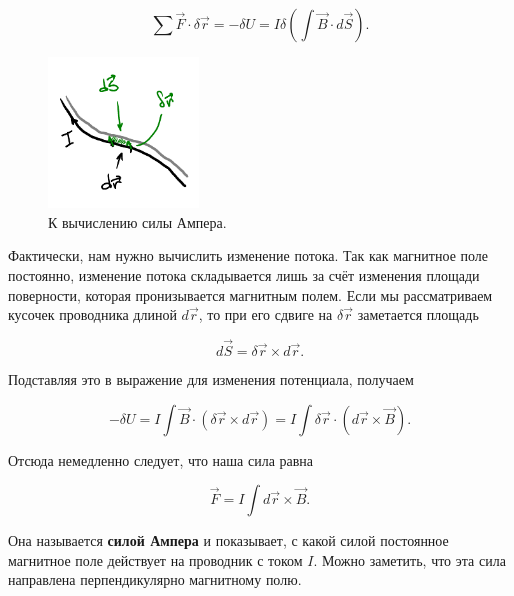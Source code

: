 \documentclass[12pt,a4paper]{article}
\numberwithin{equation}{section}
\numberwithin{equation}{section}
\begin{document}
\begin{equation}
  \label{eq:der_amperes_force_1}
 \sum \vec{F} \cdot \delta \vec{r} = -\delta U = I \delta \left( \int \vec{B}  \cdot d\vec{S}\right). 
\end{equation}

\begin{figure}
  \vspace{-1.5cm}
  \begin{center}
  \includegraphics[width=4cm]{ampere.pdf}  
  \end{center}
  \caption{К вычислению силы Ампера.}
  \label{fig:amperes_force}
\end{figure}

Фактически, нам нужно вычислить изменение потока. Так как магнитное
поле постоянно, изменение потока складывается лишь за счёт изменения
площади поверности, которая пронизывается магнитным полем. Если мы
рассматриваем кусочек проводника длиной $d\vec{r}$, то при его сдвиге
на $\delta \vec{r}$ заметается площадь 

\begin{equation}
  \label{eq:der_amperes_force_2}
  d\vec{S} = \delta \vec{r} \times d \vec{r}.
\end{equation}

Подставляя это в выражение для изменения потенциала, получаем

\begin{equation}
  \label{eq:der_amperes_force_3}
  -\delta U = I \int \vec{B} \cdot \left( \delta  \vec{r}
    \times d \vec{r}\right) = I \int \delta \vec{r} \cdot (d\vec{r} \times \vec{B}).
\end{equation}

Отсюда немедленно следует, что наша сила равна 

\begin{equation}
  \label{eq:amperes_force}
  \vec{F} = I  \int d\vec{r} \times \vec{B}.
\end{equation}

Она называется \textbf{силой Ампера} и показывает, с какой силой
постоянное магнитное поле действует на проводник с током $I$. Можно
заметить, что эта сила направлена перпендикулярно магнитному полю.
\end{document}
